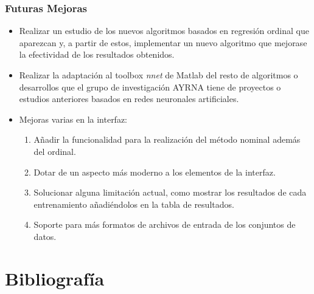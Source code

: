 \documentclass[compress,allowframebreaks]{beamer}
\begin{document}
			\begin{frame}
				\frametitle{\normalsize Futuras Mejoras}
				
				\begin{itemize}\justifying
					\item Realizar un estudio de los nuevos algoritmos basados en regresión ordinal que aparezcan y, a partir de estos, implementar un nuevo algoritmo que mejorase la efectividad de los resultados obtenidos.
					\item Realizar la adaptación al toolbox \textit{nnet} de Matlab del resto de algoritmos
o desarrollos que el grupo de investigación AYRNA tiene de proyectos o estudios anteriores basados en redes neuronales artificiales.
					\item Mejoras varias en la interfaz:
					\begin{enumerate}\justifying
						\item Añadir la funcionalidad para la realización del método nominal además del ordinal.
						\item Dotar de un aspecto más moderno a los elementos de la interfaz.
						\item Solucionar alguna limitación actual, como mostrar los resultados de cada entrenamiento añadiéndolos en la tabla de resultados.
						\item Soporte para más formatos de archivos de entrada de los conjuntos de datos.
					\end{enumerate}
				\end{itemize}
			\end{frame}

	\section{Bibliografía}
	
\end{document}
